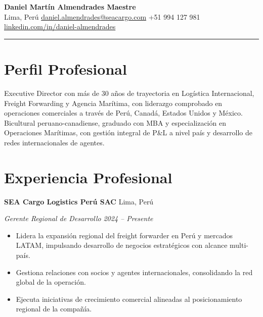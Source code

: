 \documentclass[11pt,letterpaper]{article}
\newcommand{\entry}[4]{%
  \noindent\textbf{#1} \hfill #2 \par\nopagebreak
  \textit{#3} \hfill \textit{#4} \par\nopagebreak
}
\begin{document}
\begin{center}
  {\LARGE\bfseries Daniel Martín Almendrades Maestre} \\[4pt]
  \enspace Lima, Perú
  \quad{}\enspace \href{mailto:daniel.almendrades@seacargo.com}{daniel.almendrades@seacargo.com}
  \quad{}\enspace +51 994 127 981
  \\[2pt]
  \enspace \href{https://www.linkedin.com/in/daniel-almendrades-574a2830/}{linkedin.com/in/daniel-almendrades}
\end{center}

\vspace{-0.4em}
\noindent\rule{\textwidth}{0.8pt}
\vspace{-0.2em}

\section{Perfil Profesional}

\noindent Executive Director con más de 30 años de trayectoria en Logística Internacional, Freight Forwarding y Agencia Marítima, con liderazgo comprobado en operaciones comerciales a través de Perú, Canadá, Estados Unidos y México. Bicultural peruano-canadiense, graduado con MBA y especialización en Operaciones Marítimas, con gestión integral de P\&L a nivel país y desarrollo de redes internacionales de agentes.

\section{Experiencia Profesional}

\entry{SEA Cargo Logistics Perú SAC}{Lima, Perú}{Gerente Regional de Desarrollo}{2024 -- Presente}
\begin{itemize}
  \item Lidera la expansión regional del freight forwarder en Perú y mercados LATAM, impulsando desarrollo de negocios estratégicos con alcance multi-país.
  \item Gestiona relaciones con socios y agentes internacionales, consolidando la red global de la operación.
  \item Ejecuta iniciativas de crecimiento comercial alineadas al posicionamiento regional de la compañía.
\end{itemize}
\vspace{0.3em}
\end{document}
